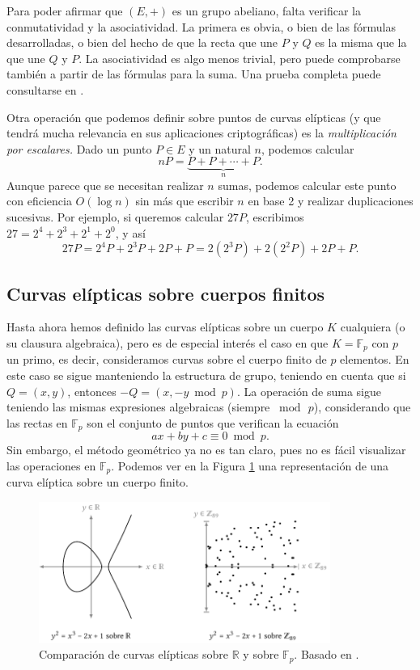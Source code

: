 \documentclass[
  a4paper,
  12pt,
  spanish,
]{scrartcl}
\begin{document}
    Para poder afirmar que $(E, +)$ es un grupo abeliano, falta verificar la conmutatividad y la asociatividad. La primera es obvia, o bien de las fórmulas desarrolladas, o bien del hecho de que la recta que une $P$ y $Q$ es la misma que la que une $Q$ y $P$. La asociatividad es algo menos trivial, pero puede comprobarse también a partir de las fórmulas para la suma. Una prueba completa puede consultarse en \parencite[sección 2.4]{elliptic_washington_2008}.

    Otra operación que podemos definir sobre puntos de curvas elípticas (y que tendrá mucha relevancia en sus aplicaciones criptográficas) es la \textit{multiplicación por escalares.} Dado un punto $P\in E$ y un natural $n$, podemos calcular \[ nP = \underbrace{P + P + \cdots + P}_{n}.\] Aunque parece que se necesitan realizar $n$ sumas, podemos calcular este punto con eficiencia $O(\log n)$ sin más que escribir $n$ en base 2 y realizar duplicaciones sucesivas. Por ejemplo, si queremos calcular $27P$, escribimos $27 = 2^4 + 2^3 + 2^1 + 2^0$, y así \[ 27P = 2^4P + 2^3P + 2P + P = 2(2^3P) + 2(2^2P) + 2P + P.\]

\subsection{Curvas elípticas sobre cuerpos finitos}

Hasta ahora hemos definido las curvas elípticas sobre un cuerpo $K$ cualquiera (o su clausura algebraica), pero es de especial interés el caso en que $K=\mathbb{F}_p$ con $p$ un primo, es decir, consideramos curvas sobre el cuerpo finito de $p$ elementos. En este caso se sigue manteniendo la estructura de grupo, teniendo en cuenta que si $Q = (x,y)$, entonces $-Q = (x, -y \bmod p)$. La operación de suma sigue teniendo las mismas expresiones algebraicas (siempre $\bmod\, p$), considerando que las rectas en $\mathbb{F}_p$ son el conjunto de puntos que verifican la ecuación \[ ax + by + c \equiv 0 \bmod p. \] Sin embargo, el método geométrico ya no es tan claro, pues no es fácil visualizar las operaciones en $\mathbb{F}_p$. Podemos ver en la Figura \ref{fig:cuerpos-curvas} una representación de una curva elíptica sobre un cuerpo finito.

\begin{figure}[h]
  \centering
  \includegraphics[width=0.85\textwidth]{img/cuerpos-curvas}
  \caption{Comparación de curvas elípticas sobre $\mathbb{R}$ y sobre $\mathbb{F}_p$. Basado en \parencite{eichlseder_elliptic_2016}.}
  \label{fig:cuerpos-curvas}
\end{figure}
\end{document}
